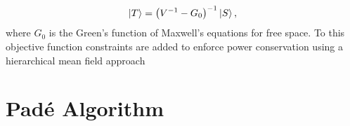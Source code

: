 \documentclass[reprint]{revtex4-2}
\begin{document}
\begin{align}
	\ket{T} = \qty(V^{-1} - G_0)^{-1}\ket{S},
\end{align}
where $G_0$ is the Green's function of Maxwell's equations for free space. To this objective function constraints are added to enforce power conservation using a hierarchical mean field approach\cite{molesky2020hierarchical}

\section{Padé Algorithm}
\label{sec:algorithm}


\end{document}
